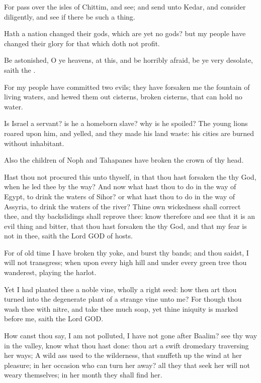 \Verse For pass over the isles of Chittim, and see; and send unto Kedar, and consider diligently, and see if there be such a thing.

\Verse Hath a nation changed their gods, which are yet no gods? but my people have changed their glory for that which doth not profit.

\Verse Be astonished, O ye heavens, at this, and be horribly afraid, be ye very desolate, saith the \LORD.

\Verse For my people have committed two evils; they have forsaken me the fountain of living waters, and hewed them out cisterns, broken cisterns, that can hold no water.

\Verse Is Israel a servant? is he a homeborn slave? why is he spoiled?  \Verse The young lions roared upon him, and yelled, and they made his land waste: his cities are burned without inhabitant.

\Verse Also the children of Noph and Tahapanes have broken the crown of thy head.

\Verse Hast thou not procured this unto thyself, in that thou hast forsaken the \LORD thy God, when he led thee by the way?  \Verse And now what hast thou to do in the way of Egypt, to drink the waters of Sihor? or what hast thou to do in the way of Assyria, to drink the waters of the river?  \Verse Thine own wickedness shall correct thee, and thy backslidings shall reprove thee: know therefore and see that it is an evil thing and bitter, that thou hast forsaken the \LORD thy God, and that my fear is not in thee, saith the Lord GOD of hosts.

\Verse For of old time I have broken thy yoke, and burst thy bands; and thou saidst, I will not transgress; when upon every high hill and under every green tree thou wanderest, playing the harlot.

\Verse Yet I had planted thee a noble vine, wholly a right seed: how then art thou turned into the degenerate plant of a strange vine unto me?  \Verse For though thou wash thee with nitre, and take thee much soap, yet thine iniquity is marked before me, saith the Lord GOD.

\Verse How canst thou say, I am not polluted, I have not gone after Baalim?  see thy way in the valley, know what thou hast done: thou art a swift dromedary traversing her ways; \Verse A wild ass used to the wilderness, that snuffeth up the wind at her pleasure; in her occasion who can turn her away? all they that seek her will not weary themselves; in her month they shall find her.

